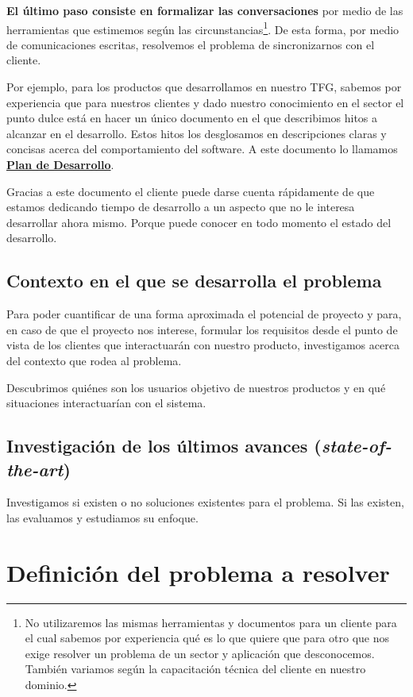 \textbf{El último paso consiste en formalizar las conversaciones} por medio de las
herramientas que estimemos según las circunstancias\footnote{%
    No utilizaremos las mismas herramientas y documentos para un cliente para el cual
    sabemos por experiencia qué es lo que quiere que para otro que nos exige resolver
    un problema de un sector y aplicación que desconocemos. También variamos según
    la capacitación técnica del cliente en nuestro dominio.
}. De esta forma, por medio de comunicaciones escritas, resolvemos el problema de
sincronizarnos con el cliente.

Por ejemplo, para los productos que desarrollamos en nuestro TFG, sabemos por experiencia
que para nuestros clientes y dado nuestro conocimiento en el sector el punto dulce está
en hacer un único documento en el que describimos hitos a alcanzar en el desarrollo.
Estos hitos los desglosamos en descripciones claras y concisas acerca del comportamiento del software.
A este documento lo llamamos \hyperref[sec:plan_de_desarrollo]{\textbf{Plan de Desarrollo}}.

Gracias a este documento el cliente puede darse
cuenta rápidamente de que estamos dedicando tiempo de desarrollo a un aspecto que no le
interesa desarrollar ahora mismo. Porque puede conocer en todo momento el estado del desarrollo.

\subsection{Contexto en el que se desarrolla el problema}

Para poder cuantificar de una forma aproximada el potencial de proyecto y para, en caso de que el
proyecto nos interese, formular los requisitos desde el punto de vista de los clientes que
interactuarán con nuestro producto, investigamos acerca del contexto que rodea al problema.

Descubrimos quiénes son los usuarios objetivo de nuestros productos y en qué situaciones
interactuarían con el sistema.

\subsection{Investigación de los últimos avances (\textit{state-of-the-art})}

Investigamos si existen o no soluciones existentes para el problema. Si las existen,
las evaluamos y estudiamos su enfoque.

\section{Definición del problema a resolver}

